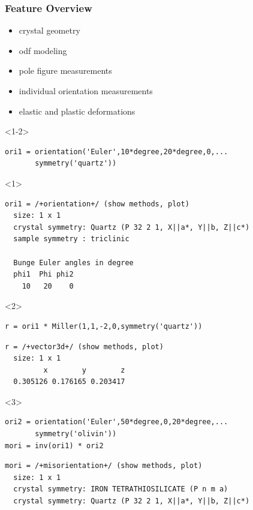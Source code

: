 \documentclass[comptress]{beamer}
\begin{document}
\begin{frame}[fragile]
  \frametitle{Feature Overview}

  \begin{overlayarea}{\textwidth}{2.5cm}
    \begin{itemize}
      \item<1-> crystal geometry
      \item<4-> odf modeling
      \item<5-> pole figure measurements
      \item<9-> individual orientation measurements
      \item<13-> elastic and plastic deformations
  \end{itemize}
  \end{overlayarea}

  \bigskip

  \begin{overlayarea}{\textwidth}{5.5cm}

  \begin{onlyenv}<1-2>
      \begin{lstlisting}[style=input]
ori1 = orientation('Euler',10*degree,20*degree,0,...
       symmetry('quartz'))
  \end{lstlisting}
\end{onlyenv}
  \begin{onlyenv}<1>
\begin{lstlisting}[style=output]
ori1 = /+orientation+/ (show methods, plot)
  size: 1 x 1
  crystal symmetry: Quartz (P 32 2 1, X||a*, Y||b, Z||c*)
  sample symmetry : triclinic

  Bunge Euler angles in degree
  phi1  Phi phi2
    10   20    0
  \end{lstlisting}
  \end{onlyenv}
  \begin{onlyenv}<2>
    \vspace{-0.3cm}
    \begin{lstlisting}[style=input]
r = ori1 * Miller(1,1,-2,0,symmetry('quartz'))
    \end{lstlisting}
    \begin{lstlisting}[style=output]
r = /+vector3d+/ (show methods, plot)
  size: 1 x 1
         x        y        z
  0.305126 0.176165 0.203417
    \end{lstlisting}
  \end{onlyenv}
  \begin{onlyenv}<3>
      \begin{lstlisting}[style=input]
ori2 = orientation('Euler',50*degree,0,20*degree,...
       symmetry('olivin'))
mori = inv(ori1) * ori2
  \end{lstlisting}
  \begin{lstlisting}[style=output]
mori = /+misorientation+/ (show methods, plot)
  size: 1 x 1
  crystal symmetry: IRON TETRATHIOSILICATE (P n m a)
  crystal symmetry: Quartz (P 32 2 1, X||a*, Y||b, Z||c*)


\end{lstlisting}
\end{onlyenv}
\end{overlayarea}
\end{frame}
\end{document}
